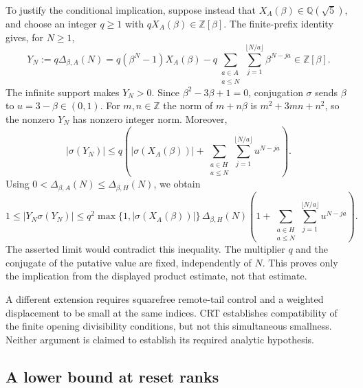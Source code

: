 \documentclass[11pt]{article}
\theoremstyle{plain}
\theoremstyle{definition}
\theoremstyle{remark}
\newcommand{\Z}{\mathbb{Z}}
\newcommand{\Q}{\mathbb{Q}}
\begin{document}
To justify the conditional implication, suppose instead that
$X_A(\beta)\in\Q(\sqrt5)$, and choose an integer $q\ge1$ with
$qX_A(\beta)\in\Z[\beta]$.  The finite-prefix identity gives, for
$N\ge1$,
\[
 Y_N:=q\Delta_{\beta,A}(N)
 =q(\beta^N-1)X_A(\beta)
  -q\sum_{\substack{a\in A\\a\le N}}
           \sum_{j=1}^{\lfloor N/a\rfloor}\beta^{N-ja}
 \in\Z[\beta].
\]
The infinite support makes $Y_N>0$.  Since
$\beta^2-3\beta+1=0$, conjugation $\sigma$ sends $\beta$ to
$u=3-\beta\in(0,1)$.  For $m,n\in\Z$ the norm of $m+n\beta$
is $m^2+3mn+n^2$, so the nonzero $Y_N$ has nonzero integer norm.
Moreover,
\[
 |\sigma(Y_N)|\le q\left(|\sigma(X_A(\beta))|
       +\sum_{\substack{a\in H\\a\le N}}
             \sum_{j=1}^{\lfloor N/a\rfloor}u^{N-ja}\right).
\]
Using $0<\Delta_{\beta,A}(N)\le\Delta_{\beta,H}(N)$, we obtain
\[
 1\le |Y_N\sigma(Y_N)|
 \le q^2\max\{1,|\sigma(X_A(\beta))|\}\,
       \Delta_{\beta,H}(N)
       \left(1+\sum_{\substack{a\in H\\a\le N}}
                  \sum_{j=1}^{\lfloor N/a\rfloor}u^{N-ja}\right).
\]
The asserted limit would contradict this inequality.  The multiplier
$q$ and the conjugate of the putative value are fixed, independently
of $N$.  This proves only the implication from the displayed product
estimate, not that estimate.

A different extension requires squarefree remote-tail control and a
weighted displacement to be small at the same indices.  CRT establishes
compatibility of the finite opening divisibility conditions, but not this
simultaneous smallness.  Neither argument is claimed to establish its
required analytic hypothesis.


\subsection{A lower bound at reset ranks}
\label{ssec:route-1}
\end{document}
